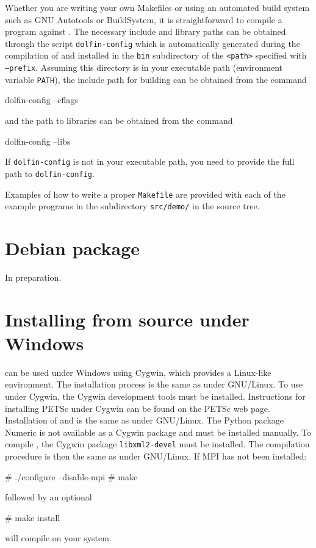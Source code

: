 Whether you are writing your own Makefiles or using an automated build
system such as GNU Autotools or BuildSystem, it is straightforward to
compile a program against \dolfin{}. The necessary include and library
paths can be obtained through the script \texttt{dolfin-config} which
is automatically generated during the compilation of \dolfin{} and
installed in the \texttt{bin} subdirectory of the \texttt{<path>}
specified with \texttt{--prefix}. Assuming this directory is in your
executable path (environment variable \texttt{PATH}), the include
path for building \dolfin{} can be obtained from the command
\begin{code}
  dolfin-config --cflags
\end{code}
and the path to \dolfin{} libraries can be obtained from the command
\begin{code}
  dolfin-config --libs
\end{code}
If \texttt{dolfin-config} is not in your executable path, you need to
provide the full path to \texttt{dolfin-config}.

Examples of how to write a proper \texttt{Makefile} are provided with
each of the example programs in the subdirectory \texttt{src/demo/} in
the \dolfin{} source tree.

\section{Debian package}

In preparation.

\section{Installing from source under Windows}
\label{app:cygwin}

\dolfin{} can be used under Windows using Cygwin, which provides a Linux-like
environment. The installation process is the same as under GNU/Linux. 
To use \dolfin{} under Cygwin, the Cygwin development tools must be installed. 
Instructions for installing PETSc under Cygwin can be found on the  PETSc web 
page. Installation of \ffc{} and \fiat{} is the same as under GNU/Linux. The 
Python package Numeric is not available as a Cygwin package and must be 
installed manually. To compile \dolfin{}, the Cygwin package  
\texttt{libxml2-devel} must be installed. The compilation procedure is then the
same as under GNU/Linux. If MPI has not been installed:
\begin{code}
  # ./configure --disable-mpi
  # make
\end{code}
followed by an optional
\begin{code}
  # make install
\end{code}
will compile \dolfin{} on your system.
